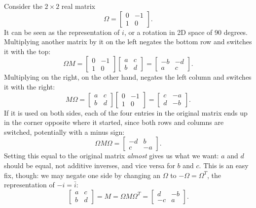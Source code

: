 \documentclass{article}
\begin{document}
Consider the $2 \times 2$ real matrix
\[
\Omega =
\begin{bmatrix}
  0 & -1 \\
  1 & 0
\end{bmatrix}.
\]
It can be seen as the representation of $i$,
or a rotation in 2D space of 90 degrees.
Multiplying another matrix by it on the left
negates the bottom row and switches it with the top:
\[
\Omega M =
\begin{bmatrix}
  0 & -1 \\
  1 & 0
\end{bmatrix}
\begin{bmatrix}
  a & c \\
  b & d
\end{bmatrix} =
\begin{bmatrix}
  -b & -d \\
  a & c
\end{bmatrix}.
\]
Multiplying on the right, on the other hand,
negates the left column and switches it with the right:
\[
M \Omega =
\begin{bmatrix}
  a & c \\
  b & d
\end{bmatrix}
\begin{bmatrix}
  0 & -1 \\
  1 & 0
\end{bmatrix} =
\begin{bmatrix}
  c & -a \\
  d & -b
\end{bmatrix}.
\]
If it is used on both sides,
each of the four entries in the original matrix
ends up in the corner opposite where it started,
since both rows and columns are switched,
potentially with a minus sign:
\[
\Omega M \Omega =
\begin{bmatrix}
  -d & b \\
  c & -a
\end{bmatrix}.
\]
Setting this equal to the original matrix \textit{almost} gives us what we want:
$a$ and $d$ should be equal, not additive inverses,
and vice versa for $b$ and $c$.
This is an easy fix, though:
we may negate one side by changing an $\Omega$ to $-\Omega = \Omega^T$,
the representation of $-i = \bar{i}$:
\[
\begin{bmatrix}
  a & c \\
  b & d
\end{bmatrix} =
M = \Omega M \Omega^T =
\begin{bmatrix}
  d & -b \\
  -c & a
\end{bmatrix}.
\]
\end{document}
